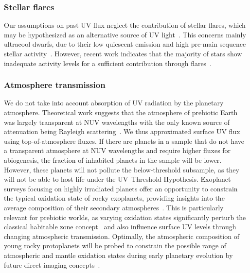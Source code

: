 \documentclass[twocolumn,twocolappendix,linenumbers]{aastex631}
\begin{document}
\subsubsection{Stellar flares}
Our assumptions on past \gls{UV} flux neglect the contribution of stellar flares, which may be hypothesized as an alternative source of \gls{UV} light~\citep{Buccino2007,Ranjan2017c}.
This concerns mainly ultracool dwarfs, due to their low quiescent emission and high pre-main sequence stellar activity~\citep{Buccino2007,West2008}.
However, recent work indicates that the majority of stars show inadequate activity levels for a sufficient contribution through flares~\citep{Glazier2020,Ducrot2020,Guenther2020}.

\subsubsection{Atmosphere transmission}
We do not take into account absorption of \gls{UV} radiation by the planetary atmosphere.
Theoretical work suggests that the atmosphere of prebiotic Earth was largely transparent at \gls{NUV} wavelengths with the only known source of attenuation being Rayleigh scattering~\citep{Ranjan2017,Ranjan2017c}.
We thus approximated surface \gls{UV} flux using top-of-atmosphere fluxes.
If there are planets in a sample that do not have a transparent atmosphere at \gls{NUV} wavelengths and require higher fluxes for abiogenesis, the fraction of inhabited planets in the sample will be lower.
However, these planets will not pollute the below-threshold subsample, as they will not be able to host life under the UV~Threshold Hypothesis.
Exoplanet surveys focusing on highly irradiated planets offer an opportunity to constrain the typical oxidation state of rocky exoplanets, providing insights into the average composition of their secondary atmospheres~\citep{Lichtenberg2024}.
This is particularly relevant for prebiotic worlds, as varying oxidation states significantly perturb the classical habitable zone concept~\citep{Nicholls2024} and also influence surface \gls{UV} levels through changing atmospheric transmission.
Optimally, the atmospheric composition of young rocky protoplanets will be probed to constrain the possible range of atmospheric and mantle oxidation states during early planetary evolution by future direct imaging concepts~\citep{Cesario2024}.

\end{document}
